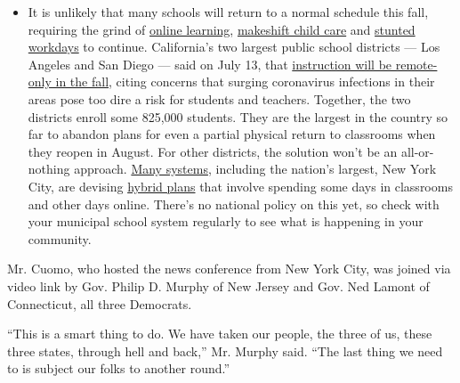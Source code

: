 \begin{itemize}
  \begin{itemize}
  \tightlist
  \item
    It is unlikely that many schools will return to a normal schedule
    this fall, requiring the grind of
    \href{https://www.nytimes.com/2020/06/05/us/coronavirus-education-lost-learning.html?action=click\&pgtype=Article\&state=default\&region=MAIN_CONTENT_3\&context=storylines_faq}{online
    learning},
    \href{https://www.nytimes.com/2020/05/29/us/coronavirus-child-care-centers.html?action=click\&pgtype=Article\&state=default\&region=MAIN_CONTENT_3\&context=storylines_faq}{makeshift
    child care} and
    \href{https://www.nytimes.com/2020/06/03/business/economy/coronavirus-working-women.html?action=click\&pgtype=Article\&state=default\&region=MAIN_CONTENT_3\&context=storylines_faq}{stunted
    workdays} to continue. California's two largest public school
    districts --- Los Angeles and San Diego --- said on July 13, that
    \href{https://www.nytimes.com/2020/07/13/us/lausd-san-diego-school-reopening.html?action=click\&pgtype=Article\&state=default\&region=MAIN_CONTENT_3\&context=storylines_faq}{instruction
    will be remote-only in the fall}, citing concerns that surging
    coronavirus infections in their areas pose too dire a risk for
    students and teachers. Together, the two districts enroll some
    825,000 students. They are the largest in the country so far to
    abandon plans for even a partial physical return to classrooms when
    they reopen in August. For other districts, the solution won't be an
    all-or-nothing approach.
    \href{https://bioethics.jhu.edu/research-and-outreach/projects/eschool-initiative/school-policy-tracker/}{Many
    systems}, including the nation's largest, New York City, are
    devising
    \href{https://www.nytimes.com/2020/06/26/us/coronavirus-schools-reopen-fall.html?action=click\&pgtype=Article\&state=default\&region=MAIN_CONTENT_3\&context=storylines_faq}{hybrid
    plans} that involve spending some days in classrooms and other days
    online. There's no national policy on this yet, so check with your
    municipal school system regularly to see what is happening in your
    community.
  \end{itemize}
\end{itemize}

Mr. Cuomo, who hosted the news conference from New York City, was joined
via video link by Gov. Philip D. Murphy of New Jersey and Gov. Ned
Lamont of Connecticut, all three Democrats.

``This is a smart thing to do. We have taken our people, the three of
us, these three states, through hell and back,'' Mr. Murphy said. ``The
last thing we need to is subject our folks to another round.''

